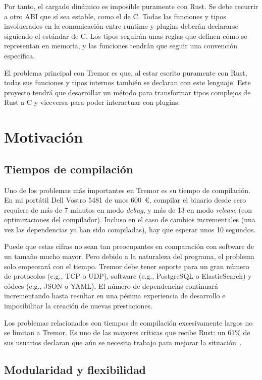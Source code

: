 Por tanto, el cargado dinámico es imposible puramente con Rust. Se debe recurrir
a otro ABI que sí sea estable, como el de C. Todas las funciones y tipos
involucrados en la comunicación entre runtime y plugins deberán declararse
siguiendo el estándar de C. Los tipos seguirán unas reglas que definen cómo se
representan en memoria, y las funciones tendrán que seguir una convención
específica.

El problema principal con Tremor es que, al estar escrito puramente con Rust,
todas sus funciones y tipos internos también se declaran con este lenguaje. Este
proyecto tendrá que desarrollar un método para transformar tipos complejos de
Rust a C y viceversa para poder interactuar con plugins.

\section{Motivación}

\subsection{Tiempos de compilación}

Uno de los problemas más importantes en Tremor es su tiempo de compilación. En
mi portátil Dell Vostro 5481 de unos 600~€, compilar el binario 
desde cero requiere de más de 7 minutos en modo \emph{debug}, y más de 13 en
modo \emph{release} (con optimizaciones del compilador). Incluso en el caso de
cambios incrementales (una vez las dependencias ya han sido compiladas), hay que
esperar unos 10 segundos.

Puede que estas cifras no sean tan preocupantes en comparación con software de
un tamaño mucho mayor. Pero debido a la naturaleza del programa, el problema
solo empeorará con el tiempo. Tremor debe tener soporte para un gran número de
protocolos (e.g., TCP o UDP), software (e.g., PostgreSQL o ElasticSearch) y
códecs (e.g., JSON o YAML). El número de dependencias continuará incrementando
hasta resultar en una pésima experiencia de desarrollo e imposibilitar la
creación de nuevas prestaciones.

Los problemas relacionados con tiempos de compilación excesivamente largos no se
limitan a Tremor. Es uno de las mayores críticas que recibe Rust: un 61\% de sus
usuarios declaran que aún se necesita trabajo para mejorar la
situación~\cite{rustsurvey}.

\subsection{Modularidad y flexibilidad}

